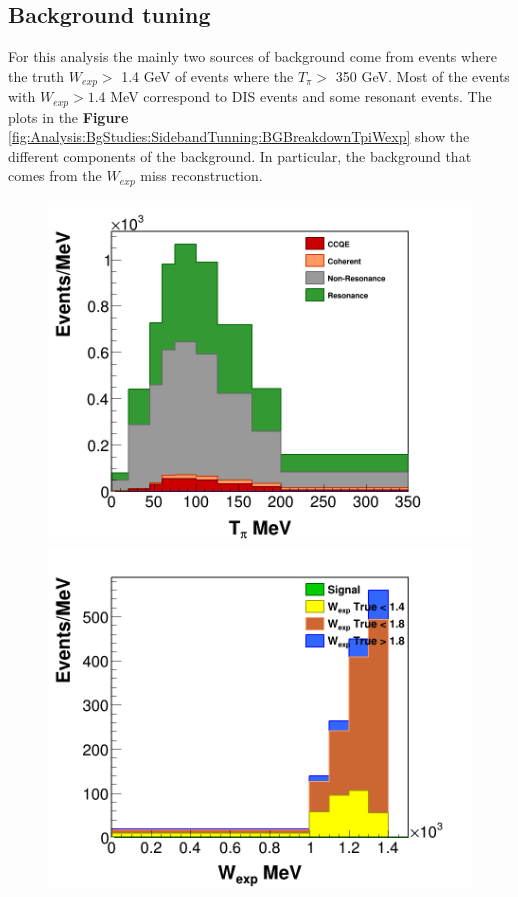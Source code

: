 \subsection{Background tuning}
\label{Cap:Analysis:BgStudies:SidebandTuning}
For this analysis the mainly two sources of background come from events where the truth $W_{exp} >$ 1.4 GeV of events where the $T_\pi > $ 350 GeV. Most of the events with $W_{exp} > 1.4 $ MeV correspond to DIS events and some resonant events. The plots in the \textbf{Figure} \ref{fig:Analysis:BgStudies:SidebandTunning:BGBreakdownTpiWexp} show the different components of the background. In particular, the background that comes from the $W_{exp}$ miss reconstruction. 

\begin{figure}[!htb]
    \centering
    \includegraphics[scale=0.2]{Figures/Chapter4/BGStudies/Bd_Background_mixtpi_Int.png}
    \includegraphics[scale=0.2]{Figures/Chapter4/BGStudies/Bd_Background_wexp_WSB.png}

\end{figure}
